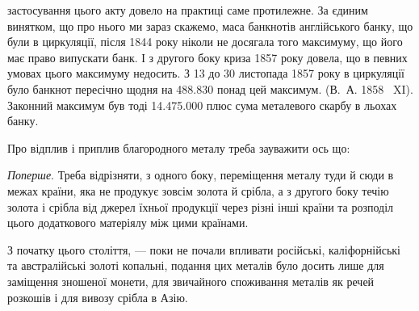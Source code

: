 \parcont{}  %
застосування цього акту довело на практиці саме протилежне. За єдиним винятком,
що про нього ми зараз скажемо, маса банкнотів англійського банку,
що були в циркуляції, після 1844 року ніколи не досягала того максимуму, що
його має право випускати банк. І з другого боку криза 1857 року довела, що
в певних умовах цього максимуму недосить. З 13 до 30 листопада 1857 року
в циркуляції було банкнот пересічно щодня на \num{488.830} понад цей
максимум. (В.~А. 1858~ XI). Законний максимум був тоді \num{14.475.000}
плюс сума металевого скарбу в льохах банку.

Про відплив і приплив благородного металу треба зауважити ось що:

\emph{Поперше}. Треба відрізняти, з одного боку, переміщення металу туди
й сюди в межах країни, яка не продукує зовсім золота й срібла, а з другого
боку течію золота і срібла від джерел їхньої продукції через різні інші країни
та розподіл цього додаткового матеріялу між цими країнами.

З початку цього століття, — поки не почали впливати російські, каліфорнійські
та австралійські золоті копальні, подання цих металів було досить лише
для заміщення зношеної монети, для звичайного споживання металів як речей
розкошів і для вивозу срібла в Азію.

